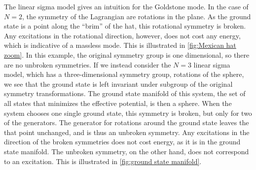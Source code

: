 The linear sigma model gives an intuition for the Goldstone mode.
In the case of $N = 2$, the symmetry of the Lagrangian are rotations in the plane.
As the ground state is a point along the ``brim'' of the hat, this rotational symmetry is broken.
Any excitations in the rotational direction, however, does not cost any energy, which is indicative of a massless mode.
This is illustrated in \autoref{fig:Mexican hat zoom}.
In this example, the original symmetry group is one dimensional, so there are no unbroken symmetries.
If we instead consider the $N=3$ linear sigma model, which has a three-dimensional symmetry group, rotations of the sphere, we see that the ground state is left invariant under subgroup of the original symmetry transformations.
The ground state manifold of this system, the set of all states that minimizes the effective potential, is then a sphere.
When the system chooses one single ground state, this symmetry is broken, but only for two of the generators. 
The generator for rotations around the ground state leaves the that point unchanged, and is thus an unbroken symmetry.
Any excitations in the direction of the broken symmetries does not cost energy, as it is in the ground state manifold.
The unbroken symmetry, on the other hand, does not correspond to an excitation.
This is illustrated in \autoref{fig:ground state manifold}.


